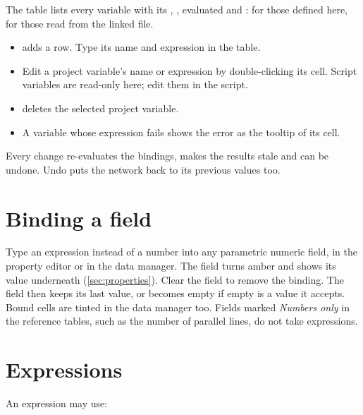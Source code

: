\begin{minipage}[t]{0.53\linewidth}
The table lists every variable with its , , evaluated
 and :  for those defined here,  for
those read from the linked file.

\begin{itemize}
  \item {} adds a row. Type its name and expression in the table.
  \item Edit a project variable's name or expression by double-clicking its cell. Script
    variables are read-only here; edit them in the script.
  \item {} deletes the selected project variable.
  \item A variable whose expression fails shows the error as the tooltip of its cell.
\end{itemize}

Every change re-evaluates the bindings, makes the results stale and can be undone. Undo
puts the network back to its previous values too.
\end{minipage}\hfill
\begin{minipage}[t]{0.42\linewidth}\vspace{0pt}
  \centering{}
\end{minipage}

\section{Binding a field}

Type an expression instead of a number into any parametric numeric field, in the
property editor or in the data manager. The field turns amber and shows its value
underneath (\cref{sec:properties}). Clear the field to remove the binding. The field then
keeps its last value, or becomes empty if empty is a value it accepts. Bound cells are tinted in the data manager too. Fields marked
\emph{Numbers only} in the reference tables, such as the number of parallel lines, do not
take expressions.

\section{Expressions}

An expression may use:

